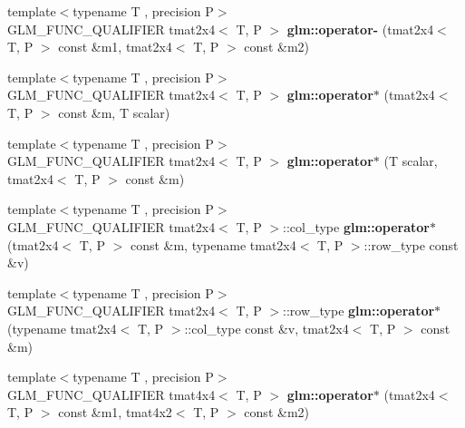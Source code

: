 \begin{DoxyCompactItemize}
\item 
\mbox{\label{type__mat2x4_8inl_ab0e4ee4a08d22d35213dd50729bbfd3c}} 
{\footnotesize template$<$typename T , precision P$>$ }\\G\+L\+M\+\_\+\+F\+U\+N\+C\+\_\+\+Q\+U\+A\+L\+I\+F\+I\+ER tmat2x4$<$ T, P $>$ {\bfseries glm\+::operator-\/} (tmat2x4$<$ T, P $>$ const \&m1, tmat2x4$<$ T, P $>$ const \&m2)
\item 
\mbox{\label{type__mat2x4_8inl_af467d081548bb7aef9d011d722090a36}} 
{\footnotesize template$<$typename T , precision P$>$ }\\G\+L\+M\+\_\+\+F\+U\+N\+C\+\_\+\+Q\+U\+A\+L\+I\+F\+I\+ER tmat2x4$<$ T, P $>$ {\bfseries glm\+::operator$\ast$} (tmat2x4$<$ T, P $>$ const \&m, T scalar)
\item 
\mbox{\label{type__mat2x4_8inl_a83ca2dfaebefca943cb27b20a67f691f}} 
{\footnotesize template$<$typename T , precision P$>$ }\\G\+L\+M\+\_\+\+F\+U\+N\+C\+\_\+\+Q\+U\+A\+L\+I\+F\+I\+ER tmat2x4$<$ T, P $>$ {\bfseries glm\+::operator$\ast$} (T scalar, tmat2x4$<$ T, P $>$ const \&m)
\item 
\mbox{\label{type__mat2x4_8inl_a3772f89585867565204253e3565e37cc}} 
{\footnotesize template$<$typename T , precision P$>$ }\\G\+L\+M\+\_\+\+F\+U\+N\+C\+\_\+\+Q\+U\+A\+L\+I\+F\+I\+ER tmat2x4$<$ T, P $>$\+::col\+\_\+type {\bfseries glm\+::operator$\ast$} (tmat2x4$<$ T, P $>$ const \&m, typename tmat2x4$<$ T, P $>$\+::row\+\_\+type const \&v)
\item 
\mbox{\label{type__mat2x4_8inl_ad617e550b85d998ff5a8e28b251f1576}} 
{\footnotesize template$<$typename T , precision P$>$ }\\G\+L\+M\+\_\+\+F\+U\+N\+C\+\_\+\+Q\+U\+A\+L\+I\+F\+I\+ER tmat2x4$<$ T, P $>$\+::row\+\_\+type {\bfseries glm\+::operator$\ast$} (typename tmat2x4$<$ T, P $>$\+::col\+\_\+type const \&v, tmat2x4$<$ T, P $>$ const \&m)
\item 
\mbox{\label{type__mat2x4_8inl_a4e69ab15c960142f85239bf176d0f033}} 
{\footnotesize template$<$typename T , precision P$>$ }\\G\+L\+M\+\_\+\+F\+U\+N\+C\+\_\+\+Q\+U\+A\+L\+I\+F\+I\+ER tmat4x4$<$ T, P $>$ {\bfseries glm\+::operator$\ast$} (tmat2x4$<$ T, P $>$ const \&m1, tmat4x2$<$ T, P $>$ const \&m2)

\end{DoxyCompactItemize}
